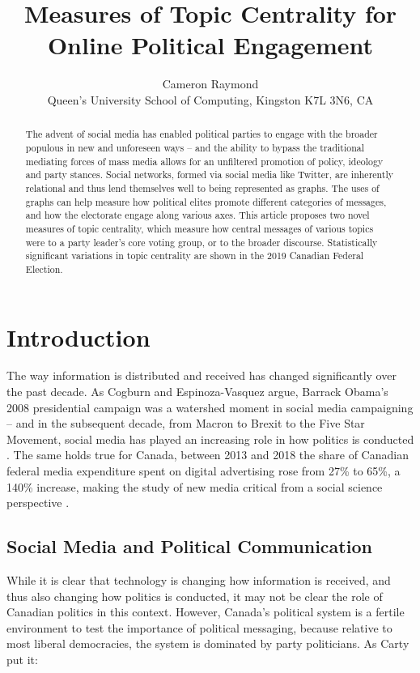 \documentclass{nws}
\title[Measures of Topic Centrality for Online Political Engagement]
      {Measures of Topic Centrality for Online Political Engagement}
\author[C.J.K Raymond]
        {Cameron Raymond\\
         Queen's University School of Computing, Kingston K7L 3N6, CA\\
         \email{c.raymond@queensu.ca}}
\begin{document}
\label{firstpage}

\maketitle

\begin{abstract}
  The advent of social media has enabled political parties to engage with the
  broader populous in new and unforeseen ways -- and the ability to bypass the
  traditional mediating forces of mass media allows for an unfiltered promotion
  of policy, ideology and party stances. Social networks, formed via social
  media like Twitter, are inherently relational and thus lend themselves well to
  being represented as graphs. The uses of graphs can help measure how political
  elites promote different categories of messages, and how the electorate engage
  along various axes. This article proposes two novel measures of topic
  centrality, which measure how central messages of various topics were to a party
  leader's core voting group, or to the broader discourse. Statistically
  significant variations in topic centrality are shown in the 2019 Canadian
  Federal Election.
\end{abstract}

\tableofcontents

\section{Introduction}

The way information is distributed and received has changed significantly over
the past decade. As Cogburn and Espinoza-Vasquez argue, Barrack Obama’s 2008
presidential campaign was a watershed moment in social media campaigning – and
in the subsequent decade, from Macron to Brexit to the Five Star Movement,
social media has played an increasing role in how politics is conducted \cite{cogburn2011networked}. The
same holds true for Canada, between 2013 and 2018 the share of Canadian federal
media expenditure spent on digital advertising rose from 27\% to 65\%, a 140\%
increase, making the study of new media critical from a social science
perspective \cite{annualReportCanadaAdvertisingActivities_2018}.

\subsection{Social Media and Political Communication}

While it is clear that technology is changing how information is received, and
thus also changing how politics is conducted, it may not be clear the role of
Canadian politics in this context. However, Canada’s political system is a
fertile environment to test the importance of political messaging, because
relative to most liberal democracies, the system is dominated by party
politicians. As Carty put it: 
\end{document}
